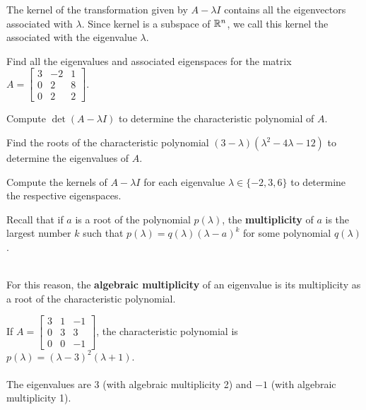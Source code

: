 \begin{applicationActivities}
\begin{definition}
  The kernel of the transformation given by \(A-\lambda I\) contains
  all the eigenvectors associated with \(\lambda\). Since kernel is a subspace
  of \(\mathbb{R}^n\), we call this kernel the  associated with the
  eigenvalue \(\lambda\).
\end{definition}


\begin{activity}{15}
  Find all the eigenvalues and associated eigenspaces for the matrix $A=\begin{bmatrix} 3 & -2 & 1 \\  0 & 2 & 8 \\ 0 & 2 & 2 \end{bmatrix}$.

\begin{subactivity}
 Compute $\det (A-\lambda I)$ to determine the characteristic polynomial of $A$.
\end{subactivity}
\begin{subactivity}
Find the roots of the characteristic polynomial
\((3-\lambda)(\lambda^2-4\lambda-12)\)
to determine the eigenvalues of $A$.
\end{subactivity}
\begin{subactivity}
Compute the kernels of $A-\lambda I$ for each eigenvalue
$\lambda\in\{-2,3,6\}$ to determine the respective eigenspaces.
\end{subactivity}
\end{activity}

\begin{observation}
  Recall that if \(a\) is a root of the polynomial \(p(\lambda)\), the {\bf multiplicity} of $a$ is the largest number $k$ such that \(p(\lambda)=q(\lambda)(\lambda-a)^k\) for some polynomial $q(\lambda)$.

\ \\

  For this reason, the {\bf algebraic multiplicity} of an eigenvalue is its multiplicity as a root of the characteristic polynomial.

  \end{observation}
  \begin{example}
  If $A=\begin{bmatrix} 3 & 1 & -1 \\ 0 & 3 & 3 \\ 0 & 0 & -1 \end{bmatrix}$, the characteristic polynomial is $p(\lambda) = (\lambda-3)^2 (\lambda+1)$. \\
  \ \\
  The eigenvalues are $3$ (with algebraic multiplicity 2) and $-1$ (with algebraic multiplicity 1).
  \end{example}

\end{applicationActivities}
